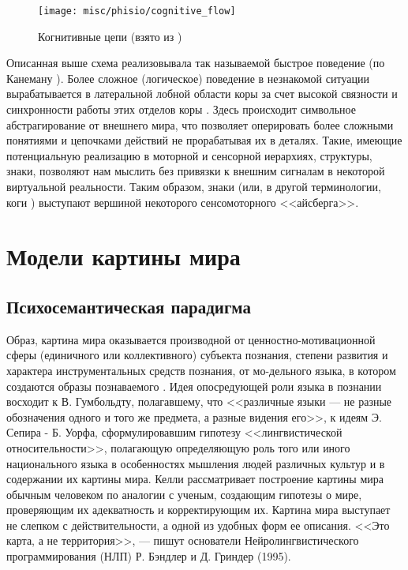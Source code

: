 \documentclass[12pt]{report}
\begin{document}
	\begin{figure}
		\centering
		\texttt{[image: misc/phisio/cognitive\_flow]}
		\caption{Когнитивные цепи (взято из \cite{Solari2011})}
		\label{fig:cog_flow}		
	\end{figure}

	Описанная выше схема реализовывала так называемой быстрое поведение (по Канеману \cite{Kahneman2011}). Более сложное (логическое) поведение в незнакомой ситуации вырабатывается в латеральной лобной области коры \cite{Cole2013} за счет высокой связности и синхронности работы этих отделов коры \cite{Baars2013}. Здесь происходит символьное абстрагирование от внешнего мира, что позволяет оперировать более сложными понятиями и цепочками действий не прорабатывая их в деталях. Такие, имеющие потенциальную реализацию в моторной и сенсорной иерархиях, структуры, знаки, позволяют нам мыслить без привязки к внешним сигналам в некоторой виртуальной реальности. Таким образом, знаки (или, в другой терминологии, коги \cite{Anokhin2016}) выступают вершиной некоторого сенсомоторного <<айсберга>>.

	
	\printbibliography[keyword={neuro},resetnumbers=true]
	
	\chapter{Модели картины мира}
	\section{Психосемантическая парадигма}
	
	Образ, картина мира оказывается производной от ценностно-мотивационной сферы (единичного или коллективного) субъекта познания, степени развития и характера инструментальных средств познания, от мо-дельного языка, в котором создаются образы познаваемого \cite{Petrenko2009}. Идея опосредующей роли языка в познании восходит к В. Гумбольдту, полагавшему, что <<различные языки --- не разные обозначения одного и того же предмета, а разные видения его>>, к идеям Э. Сепира - Б. Уорфа, сформулировавшим гипотезу <<лингвистической относительности>>, полагающую определяющую роль того или иного национального языка в особенностях мышления людей различных культур и в содержании их картины мира. Келли рассматривает построение картины мира обычным человеком по аналогии с ученым, создающим гипотезы о мире, проверяющим их адекватность и корректирующим их. 
	Картина мира выступает не слепком с действительности, а одной из удобных форм ее описания. <<Это карта, а не территория>>, --- пишут основатели Нейролингвистического программирования (НЛП) Р. Бэндлер	и Д. Гриндер (1995).
\end{document}
